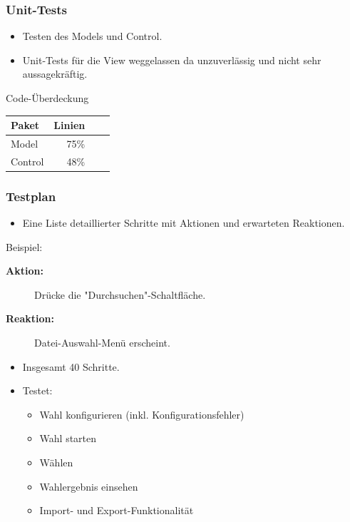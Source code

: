 \documentclass{beamer}
\begin{document}
\begin{frame}
\frametitle{Unit-Tests}
	\begin{itemize}
		\item Testen des Models und Control.
		\item Unit-Tests für die View weggelassen da unzuverlässig und nicht sehr aussagekräftig.
	\end{itemize}

	\pause
	\begin{block}{Code-Überdeckung}
		\begin{table}
			\begin{tabular}{l r r r}
				Paket & Linien \\
				\hline
				Model & 75\% \\
				Control & 48\% \\
			\end{tabular}
		\end{table}
	\end{block}
\end{frame}

\begin{frame}
\frametitle{Testplan}
	\begin{itemize}
		\item Eine Liste detaillierter Schritte mit Aktionen und erwarteten Reaktionen. \\
	\end{itemize}

	\begin{block}{Beispiel:}
		\begin{description}
			\item[\textbf{Aktion:}] Drücke die "Durchsuchen"-Schaltfläche.
			\item[\textbf{Reaktion:}] Datei-Auswahl-Menü erscheint.
		\end{description}
	\end{block}
	\begin{itemize}
		\item Insgesamt 40 Schritte.
		\item Testet:
		\begin{itemize}
			\item Wahl konfigurieren (inkl. Konfigurationsfehler)
			\item Wahl starten
			\item Wählen
			\item Wahlergebnis einsehen
			\item Import- und Export-Funktionalität
		\end{itemize}
	\end{itemize}
\end{frame}
\end{document}
